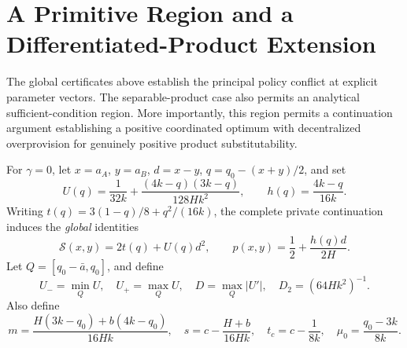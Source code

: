 \section{A Primitive Region and a Differentiated-Product Extension}
\label{sec:analytic-region}

The global certificates above establish the principal policy conflict at
explicit parameter vectors. The separable-product case also permits an
analytical sufficient-condition region. More importantly, this region
permits a continuation argument establishing a positive coordinated
optimum with decentralized overprovision for genuinely positive product
substitutability.

For $\gamma=0$, let $x=a_A$, $y=a_B$, $d=x-y$,
$q=q_0-(x+y)/2$, and set
\begin{equation}
U(q)=\frac{1}{32k}+\frac{(4k-q)(3k-q)}{128Hk^2},
\qquad h(q)=\frac{4k-q}{16k}.
\label{eq:analytic-U}
\end{equation}
Writing $t(q)=3(1-q)/8+q^2/(16k)$, the complete private
continuation induces the \emph{global} identities
\begin{equation}
\mathcal S(x,y)=2t(q)+U(q)d^2,\qquad
p(x,y)=\frac12+\frac{h(q)d}{2H}.
\label{eq:analytic-global}
\end{equation}
Let $Q=[q_0-\bar a,q_0]$, and define
\[
U_-=\min_Q U,\quad U_+=\max_Q U,\quad
D=\max_Q|U'|,\quad D_2=(64Hk^2)^{-1}.
\]
Also define
\begin{equation}
m=\frac{H(3k-q_0)+b(4k-q_0)}{16Hk},\quad
s=c-\frac{H+b}{16Hk},\quad
t_c=c-\frac1{8k},\quad
\mu_0=\frac{q_0-3k}{8k}.
\label{eq:analytic-parameters}
\end{equation}

